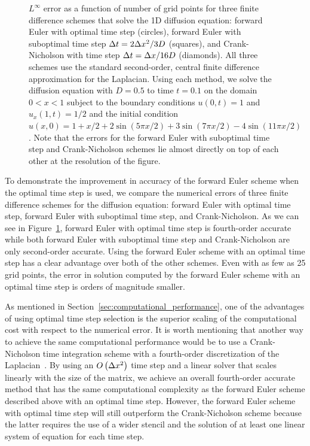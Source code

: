 \documentclass[oneeqnum,onefignum,onetabnum,onethmnum]{siamltex}
\begin{document}
\begin{figure}[tb]
\begin{center}
\caption{$L^\infty$ error as a function of number of grid points for three 
finite difference schemes that solve the 1D diffusion equation: forward Euler 
with optimal time step (circles), forward Euler with suboptimal time step
$\Delta t = 2\Delta x^2/3D$ (squares), and Crank-Nicholson with time step 
$\Delta t = \Delta x/16 D$ (diamonds).  All three schemes use the standard second-order, 
central finite difference approximation for the Laplacian.  Using each method, 
we solve the diffusion equation with $D = 0.5$ to time $t = 0.1$ on the 
domain $0 < x < 1$ subject to the boundary conditions $u(0,t) = 1$ and 
$u_x(1,t) = 1/2$ and the initial condition
$u(x,0) = 1 + x/2 + 2 \sin(5 \pi x/2) + 3 \sin(7 \pi x/2) 
- 4 \sin(11 \pi x/2)$.  
Note that the errors for the forward Euler with suboptimal time 
step and Crank-Nicholson schemes lie almost directly on top of each other
at the resolution of the figure.
}
\label{fig:diffusion_eqn_1d_no_src_error}
\end{center}
\end{figure}

To demonstrate the improvement in accuracy of the forward Euler scheme when 
the optimal time step is used, we compare the numerical errors of three finite 
difference schemes for the diffusion equation: forward Euler with optimal
time step, forward Euler with suboptimal time step, and Crank-Nicholson.  
As we can see in Figure~\ref{fig:diffusion_eqn_1d_no_src_error}, forward 
Euler with optimal time step is fourth-order accurate while both forward Euler 
with suboptimal time step and Crank-Nicholson are only second-order accurate.  
Using the forward Euler scheme with an optimal time step has a clear 
advantage over both of the other schemes.  Even with as few as 25 grid 
points, the error in solution computed by the forward Euler scheme with an 
optimal time step is orders of magnitude smaller. 

As mentioned in Section~\ref{sec:computational_performance}, one of the 
advantages of using optimal time step selection is the superior scaling of 
the computational cost with respect to the numerical error.  It is worth 
mentioning that another way to achieve the same computational performance
would be to use a Crank-Nicholson time integration scheme with a fourth-order 
discretization of the Laplacian~\cite{gibou_2005}.  By using an 
$O\left(\Delta x^2 \right)$ time step and a linear solver that scales linearly 
with the size of the matrix, we achieve an overall fourth-order accurate 
method that has the same computational complexity as the forward Euler scheme
described above with an optimal time step.  However, the forward Euler scheme 
with optimal time step will still outperform the Crank-Nicholson scheme 
because the latter requires the use of a wider stencil and the solution of 
at least one linear system of equation for each time step. 
\end{document}
